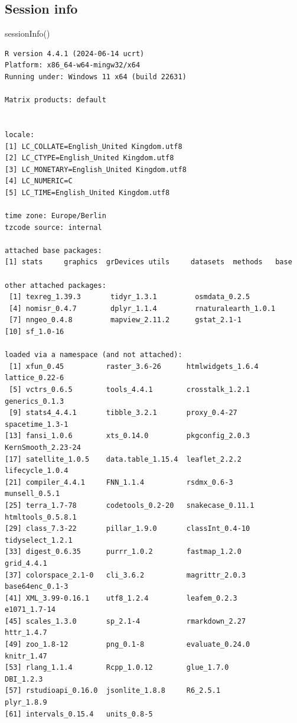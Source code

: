 \documentclass[
  letterpaper,
  DIV=11,
  numbers=noendperiod]{scrreprt}
\newenvironment{Shaded}{\begin{snugshade}}{\end{snugshade}}
\newcommand{\FunctionTok}[1]{\textcolor[rgb]{0.28,0.35,0.67}{#1}}
\newcommand{\NormalTok}[1]{\textcolor[rgb]{0.00,0.23,0.31}{#1}}
\begin{document}
\hypertarget{session-info}{%
\subsection*{Session info}\label{session-info}}

\begin{Shaded}
\begin{Highlighting}[]
\FunctionTok{sessionInfo}\NormalTok{()}
\end{Highlighting}
\end{Shaded}

\begin{verbatim}
R version 4.4.1 (2024-06-14 ucrt)
Platform: x86_64-w64-mingw32/x64
Running under: Windows 11 x64 (build 22631)

Matrix products: default


locale:
[1] LC_COLLATE=English_United Kingdom.utf8 
[2] LC_CTYPE=English_United Kingdom.utf8   
[3] LC_MONETARY=English_United Kingdom.utf8
[4] LC_NUMERIC=C                           
[5] LC_TIME=English_United Kingdom.utf8    

time zone: Europe/Berlin
tzcode source: internal

attached base packages:
[1] stats     graphics  grDevices utils     datasets  methods   base     

other attached packages:
 [1] texreg_1.39.3       tidyr_1.3.1         osmdata_0.2.5      
 [4] nomisr_0.4.7        dplyr_1.1.4         rnaturalearth_1.0.1
 [7] nngeo_0.4.8         mapview_2.11.2      gstat_2.1-1        
[10] sf_1.0-16          

loaded via a namespace (and not attached):
 [1] xfun_0.45          raster_3.6-26      htmlwidgets_1.6.4  lattice_0.22-6    
 [5] vctrs_0.6.5        tools_4.4.1        crosstalk_1.2.1    generics_0.1.3    
 [9] stats4_4.4.1       tibble_3.2.1       proxy_0.4-27       spacetime_1.3-1   
[13] fansi_1.0.6        xts_0.14.0         pkgconfig_2.0.3    KernSmooth_2.23-24
[17] satellite_1.0.5    data.table_1.15.4  leaflet_2.2.2      lifecycle_1.0.4   
[21] compiler_4.4.1     FNN_1.1.4          rsdmx_0.6-3        munsell_0.5.1     
[25] terra_1.7-78       codetools_0.2-20   snakecase_0.11.1   htmltools_0.5.8.1 
[29] class_7.3-22       pillar_1.9.0       classInt_0.4-10    tidyselect_1.2.1  
[33] digest_0.6.35      purrr_1.0.2        fastmap_1.2.0      grid_4.4.1        
[37] colorspace_2.1-0   cli_3.6.2          magrittr_2.0.3     base64enc_0.1-3   
[41] XML_3.99-0.16.1    utf8_1.2.4         leafem_0.2.3       e1071_1.7-14      
[45] scales_1.3.0       sp_2.1-4           rmarkdown_2.27     httr_1.4.7        
[49] zoo_1.8-12         png_0.1-8          evaluate_0.24.0    knitr_1.47        
[53] rlang_1.1.4        Rcpp_1.0.12        glue_1.7.0         DBI_1.2.3         
[57] rstudioapi_0.16.0  jsonlite_1.8.8     R6_2.5.1           plyr_1.8.9        
[61] intervals_0.15.4   units_0.8-5       
\end{verbatim}
\end{document}
